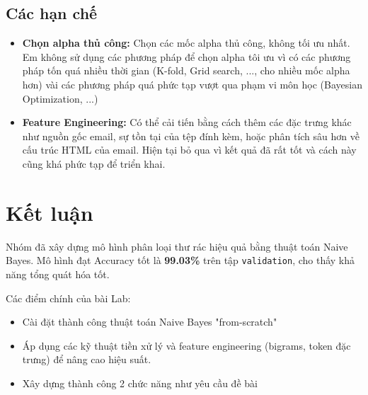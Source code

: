 \subsection{Các hạn chế}
\begin{itemize}
    \item \textbf{Chọn alpha thủ công:} Chọn các mốc alpha thủ công, không tối ưu nhất. Em không sử dụng các phương pháp để chọn alpha tôi ưu vì có các phương pháp tốn quá nhiều thời gian (K-fold, Grid search, ..., cho nhiều mốc alpha hơn) vài các phương pháp quá phức tạp vượt qua phạm vi môn học (Bayesian Optimization, ...)
    \item \textbf{Feature Engineering:} Có thể cải tiến bằng cách thêm các đặc trưng khác như nguồn gốc email, sự tồn tại của tệp đính kèm, hoặc phân tích sâu hơn về cấu trúc HTML của email. Hiện tại bỏ qua vì kết quả đã rất tốt và cách này cũng khá phức tạp để triển khai.
\end{itemize}

\section{Kết luận}
 Nhóm đã xây dựng mô hình phân loại thư rác hiệu quả bằng thuật toán Naive Bayes. Mô hình đạt Accuracy tốt là \textbf{99.03\%} trên tập \texttt{validation}, cho thấy khả năng tổng quát hóa tốt.

Các điểm chính của bài Lab:
\begin{itemize}
    \item Cài đặt thành công thuật toán Naive Bayes "from-scratch"
    \item Áp dụng các kỹ thuật tiền xử lý và feature engineering (bigrams, token đặc trưng) để nâng cao hiệu suất.
    \item Xây dựng thành công 2 chức năng như yêu cầu đề bài
\end{itemize}